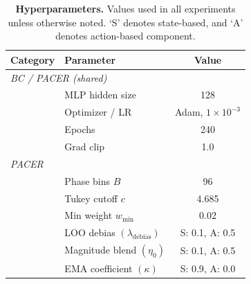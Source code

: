 \documentclass[a4paper, 10pt, conference]{ieeeconf}
\begin{document}
\begin{table}[htbp]
    \centering
    \small
    \setlength{\tabcolsep}{4pt}
    \begin{tabular}{l l c}
        \toprule
        \textbf{Category} & \textbf{Parameter} & \textbf{Value} \\
        \midrule

        \multicolumn{3}{l}{\textit{BC / PACER (shared)}} \\
        & MLP hidden size & 128 \\
        & Optimizer / LR & Adam, $1\times10^{-3}$ \\
        & Epochs & 240 \\
        & Grad clip & 1.0 \\

        \midrule
        \multicolumn{3}{l}{\textit{PACER}} \\
        & Phase bins $B$ & 96 \\
        & Tukey cutoff $c$ & 4.685 \\
        & Min weight $w_{\min}$ & 0.02 \\

        & LOO debias $(\lambda_{\text{debias}})$ &
        S: 0.1, A: 0.5 \\

        & Magnitude blend $(\eta_0)$ &
        S: 0.1, A: 0.5 \\

        & EMA coefficient $(\kappa)$ &
        S: 0.9, A: 0.0 \\

        \bottomrule
    \end{tabular}
    \caption{\textbf{Hyperparameters.} Values used in all experiments unless otherwise noted.
    `S' denotes state-based, and `A' denotes action-based component.}
    \label{tab:hparams}
\end{table}
\end{document}

